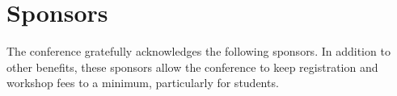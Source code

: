 \chapter{Sponsors}
\thispagestyle{empty} %

\newcommand{\placePlatiumSponsorLogo}[1]{
     \raisebox{-0.5\height}{\texttt{[image: local\_img/sponsors/\#1]}}
}

\newcommand{\placeGoldSponsorLogo}[1]{
     \raisebox{-0.5\height}{\texttt{[image: local\_img/sponsors/\#1]}}
}

\newcommand{\placeSilverSponsorLogo}[1]{
     \raisebox{-0.5\height}{\texttt{[image: local\_img/sponsors/\#1]}}
}

\newcommand{\placeBronzeSponsorLogo}[1]{
     \raisebox{-0.5\height}{\texttt{[image: local\_img/sponsors/\#1]}}
}

\newcommand{\placeSupporterLogo}[1]{
     \raisebox{-0.5\height}{\texttt{[image: local\_img/sponsors/\#1]}}
}

\def \separationwidth {1cm}

\vspace{-3cm} %
\noindent
The conference gratefully acknowledges the following sponsors.  In
addition to other benefits, these sponsors allow the conference to
keep registration and workshop fees to a minimum, particularly for
students.\\

